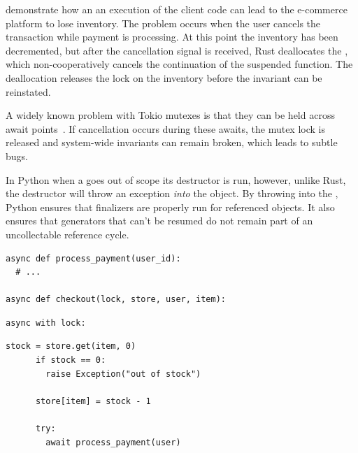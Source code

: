  demonstrate how an an execution of the client code can lead to the e-commerce platform to lose inventory. The problem occurs when the user cancels the transaction while payment is processing. At this point the inventory has been decremented, but after the cancellation signal is received, Rust deallocates the \coro, which non-cooperatively cancels the continuation of the suspended  function. The deallocation releases the lock on the inventory before the invariant can be reinstated.

A widely known problem with Tokio mutexes is that they can be held across await points~\cite{paharia_400_2025,paharia_cancelling_2025}. If cancellation occurs during these awaits, the mutex lock is released and system-wide invariants can remain broken, which leads to subtle bugs.

In Python when a \coro goes out of scope its destructor is run, however, unlike Rust, the destructor will throw an exception \textit{into} the \coro object. By throwing into the \coro, Python ensures that finalizers are properly run for referenced objects. It also ensures that generators that can't be resumed do not remain part of an uncollectable reference cycle.


\begin{lrbox}{\aastateA}
\begin{lstlisting}[language=Py,numbers=none]
async def process_payment(user_id):
  # ...

async def checkout(lock, store, user, item):
\end{lstlisting}
\end{lrbox}

\begin{lrbox}{\aastateB}
\begin{lstlisting}[language=Py,numbers=none]
    async with lock:
\end{lstlisting}
\end{lrbox}

\begin{lrbox}{\aastateC}
\begin{lstlisting}[language=Py,numbers=none]
      stock = store.get(item, 0)
      if stock == 0:
        raise Exception("out of stock")

      store[item] = stock - 1

      try:
        await process_payment(user)
\end{lstlisting}
\end{lrbox}

